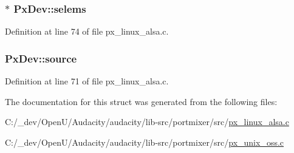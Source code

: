 \subsubsection[{\texorpdfstring{selems}{selems}}]{$\ast$ Px\+Dev\+::selems}\hypertarget{struct_px_dev_ab3d66a4034ed70766ef65563870e2c09}{}\label{struct_px_dev_ab3d66a4034ed70766ef65563870e2c09}


Definition at line 74 of file px\+\_\+linux\+\_\+alsa.\+c.

\subsubsection[{\texorpdfstring{source}{source}}]{ Px\+Dev\+::source}\hypertarget{struct_px_dev_ac68ecd5ff76aaacc51b8f221b881523e}{}\label{struct_px_dev_ac68ecd5ff76aaacc51b8f221b881523e}


Definition at line 71 of file px\+\_\+linux\+\_\+alsa.\+c.



The documentation for this struct was generated from the following files\+:\begin{DoxyCompactItemize}
\item 
C\+:/\+\_\+dev/\+Open\+U/\+Audacity/audacity/lib-\/src/portmixer/src/\hyperlink{px__linux__alsa_8c}{px\+\_\+linux\+\_\+alsa.\+c}\item 
C\+:/\+\_\+dev/\+Open\+U/\+Audacity/audacity/lib-\/src/portmixer/src/\hyperlink{px__unix__oss_8c}{px\+\_\+unix\+\_\+oss.\+c}\end{DoxyCompactItemize}
